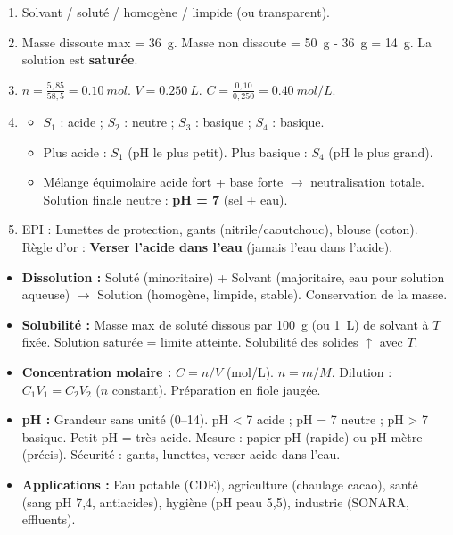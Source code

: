 \documentclass[11pt]{article}
\begin{document}
\begin{corrige}
\begin{enumerate}
\item Solvant / soluté / homogène / limpide (ou transparent).
\item Masse dissoute max = \SI{36}{g}. Masse non dissoute = \SI{50}{g} - \SI{36}{g} = \SI{14}{g}. La solution est \textbf{saturée}.
\item $n = \frac{5,85}{58,5} = \SI{0,10}{mol}$. $V = \SI{0,250}{L}$. $C = \frac{0,10}{0,250} = \SI{0,40}{mol/L}$.
\item 
\begin{itemize}
\item[a)] $S_1$ : acide ; $S_2$ : neutre ; $S_3$ : basique ; $S_4$ : basique.
\item[b)] Plus acide : $S_1$ (pH le plus petit). Plus basique : $S_4$ (pH le plus grand).
\item[c)] Mélange équimolaire acide fort + base forte $\rightarrow$ neutralisation totale. Solution finale neutre : \textbf{pH = 7} (sel  + eau).
\end{itemize}
\item EPI : Lunettes de protection, gants (nitrile/caoutchouc), blouse (coton). Règle d'or : \textbf{Verser l'acide dans l'eau} (jamais l'eau dans l'acide).
\end{enumerate}
\end{corrige}

\begin{aretenir}
\begin{itemize}
\item \textbf{Dissolution :} Soluté (minoritaire) + Solvant (majoritaire, eau pour solution aqueuse) $\rightarrow$ Solution (homogène, limpide, stable). Conservation de la masse.
\item \textbf{Solubilité :} Masse max de soluté dissous par \SI{100}{g} (ou \SI{1}{L}) de solvant à $T$ fixée. Solution saturée = limite atteinte. Solubilité des solides $\uparrow$ avec $T$.
\item \textbf{Concentration molaire :} $C = n/V$ (mol/L). $n = m/M$. Dilution : $C_1 V_1 = C_2 V_2$ ($n$ constant). Préparation en fiole jaugée.
\item \textbf{pH :} Grandeur sans unité (0--14). pH < 7 acide ; pH = 7 neutre ; pH > 7 basique. Petit pH = très acide. Mesure : papier pH (rapide) ou pH-mètre (précis). Sécurité : gants, lunettes, verser acide dans l'eau.
\item \textbf{Applications :} Eau potable (CDE), agriculture (chaulage cacao), santé (sang pH 7,4, antiacides), hygiène (pH peau 5,5), industrie (SONARA, effluents).
\end{itemize}
\end{aretenir}
\end{document}
